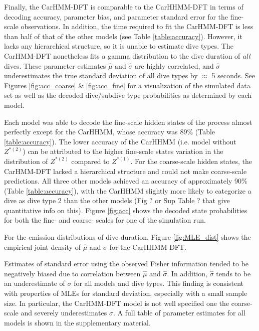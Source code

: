 Finally, the CarHMM-DFT is comparable to the CarHHMM-DFT in terms of decoding accuracy, parameter bias, and parameter standard error for the fine-scale observations. In addition, the time required to fit the CarHMM-DFT is less than half of that of the other models (see Table \ref{table:accuracy}). However, it lacks any hierarchical structure, so it is unable to estimate dive types. The CarHMM-DFT nonetheless fits a gamma distribution to the dive duration of \textit{all} dives. These parameter estimates $\hat \mu$ and $\hat \sigma$ are highly correlated, and $\hat \sigma$ underestimates the true standard deviation of all dive types by $\approx$ 5 seconds. See Figures \ref{fig:acc_coarse} \& \ref{fig:acc_fine} for a visualization of the simulated data set as well as the decoded dive/subdive type probabilities as determined by each model.






\iffalse
Each model was able to decode the fine-scale hidden states of the process almost perfectly except for the CarHHMM, whose accuracy was 89\% (Table \ref{table:accuracy}). The lower accuracy of the CarHHMM (i.e. model without $Z^{*(2)}$)  can be attributed to the higher fine-scale states variation in the distribution of $Z^{*(2)}$ compared to $Z^{*(1)}$. For the coarse-scale hidden states, the CarHMM-DFT lacked a hierarchical structure and could not make coarse-scale predictions. All three other models achieved an accuracy of approximately 90\% (Table \ref{table:accuracy}), with the CarHHMM slightly more likely to categorize a dive as dive type 2 than the other models (Fig ? or Sup Table ? that give quantitative info on this). Figure \ref{fig:acc} shows the decoded state probabilities for both the fine- and coarse- scales for one of the simulation run.

For the emission distributions of dive duration, Figure \ref{fig:MLE_dist} shows the empirical joint density of $\hat \mu$ and $\hat \sigma$ for the CarHHMM-DFT.

Estimates of standard error using the observed Fisher information tended to be negatively biased due to correlation between $\hat \mu$ and $\hat \sigma$. In addition, $\hat \sigma$ tends to be an underestimate of $\sigma$ for all models and dive types. This finding is consistent with properties of MLEs for standard deviation, especially with a small sample size. In particular, the CarHMM-DFT model is not well specified one the coarse-scale and severely underestimates $\sigma$. %
A full table of parameter estimates for all models is shown in the supplementary material.


